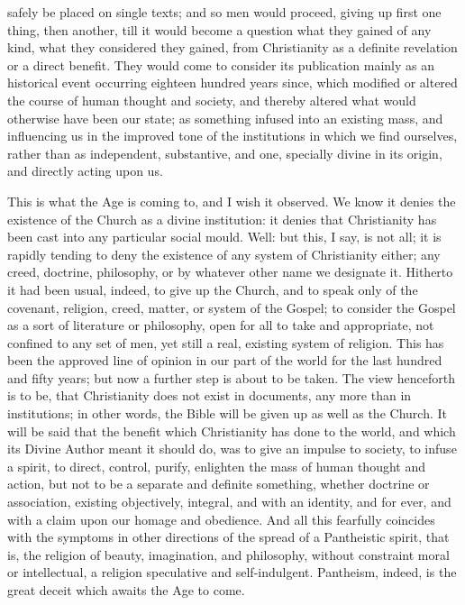 safely be placed on single texts; and so men would proceed, giving up
first one thing, then another, till it would become a question what
they gained of any kind, what they considered they gained, from
Christianity as a definite revelation or a direct benefit. They would
come to consider its publication mainly as an historical event
occurring eighteen hundred years since, which modified or altered the
course of human thought and society, and thereby altered what would
otherwise have been our state; as something infused into an existing
mass, and influencing us in the improved tone of the institutions in
which we find ourselves, rather than as independent, substantive, and
one, specially divine in its origin, and directly acting upon us.

This is what the Age is coming to, and I wish it observed. We know
it denies the existence of the Church as a divine institution: it
denies that Christianity has been cast into any particular social
mould. Well: but this, I say, is not all; it is rapidly tending to
deny the existence of any system of Christianity either; any creed,
doctrine, philosophy, or by whatever other name we designate it.
Hitherto it had been usual, indeed, to give up the Church, and to
speak only of the covenant, religion, creed, matter, or system of the
Gospel; to consider the Gospel as a sort of literature or philosophy,
open for all to take and appropriate, not confined to any set of
men, yet still a real, existing system of religion. This has been the
approved line of opinion in our part of the world for the last hundred
and fifty years; but now a further step is about to be taken. The view
henceforth is to be, that Christianity does not exist in documents,
any more than in institutions; in other words, the Bible will be given
up as well as the Church. It will be said that the benefit which
Christianity has done to the world, and which its Divine Author meant
it should do, was to give an impulse to society, to infuse a spirit,
to direct, control, purify, enlighten the mass of human thought and
action, but not to be a separate and definite something, whether
doctrine or association, existing objectively, integral, and with an
identity, and for ever, and with a claim upon our homage and
obedience. And all this fearfully coincides with the symptoms in other
directions of the spread of a Pantheistic spirit, that is, the
religion of beauty, imagination, and philosophy, without constraint
moral or intellectual, a religion speculative and self-indulgent.
Pantheism, indeed, is the great deceit which awaits the Age to come.

